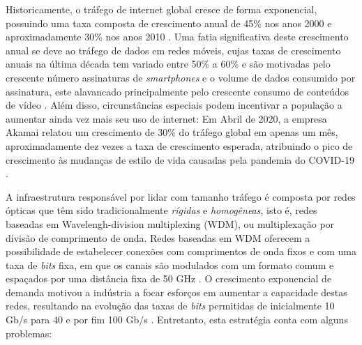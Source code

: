 

Historicamente, o tráfego de internet global cresce de forma exponencial, possuindo uma taxa composta de crescimento anual de 45\% nos anos 2000 \cite{network_evolution_2020} e aproximadamente 30\% nos anos 2010 \cite{cisco2011cisco, cisco2012cisco, cisco2013cisco, cisco2014cisco, cisco2015cisco, cisco2016cisco, cisco2017cisco, cisco2018cisco}. Uma fatia significativa deste crescimento anual se deve ao tráfego de dados em redes móveis, cujas taxas de crescimento anuais na última década tem variado entre 50\% a 60\% e são motivadas pelo crescente número assinaturas de \textit{smartphones} e o volume de dados consumido por assinatura, este alavancado principalmente pelo crescente consumo de conteúdos de vídeo \cite{ericsson_mobility_report_2020}. Além disso, circunstâncias especiais podem incentivar a população a aumentar ainda vez mais seu uso de internet: Em Abril de 2020, a empresa Akamai relatou um crescimento de 30\% do tráfego global em apenas um mês, aproximadamente dez vezes a taxa de crescimento esperada, atribuindo o pico de crescimento às mudanças de estilo de vida causadas pela pandemia do COVID-19 \cite{mckeay_2020}.

A infraestrutura responsável por lidar com tamanho tráfego é composta por redes ópticas que têm sido tradicionalmente \textit{rígidas} e \textit{homogêneas}, isto é, redes baseadas em Wavelengh-division multiplexing (WDM), ou multiplexação por divisão de comprimento de onda. Redes baseadas em WDM oferecem a possibilidade de estabelecer conexões com comprimentos de onda fixos e com uma taxa de \textit{bits} fixa, em que os canais são modulados com um formato comum e espaçados por uma distância fixa de 50 GHz \cite{eon_tutorial_2014, jinno_eon_benefits}. O crescimento exponencial de demanda motivou a indústria a focar esforços em aumentar a capacidade destas redes, resultando na evolução das taxas de \textit{bits} permitidas de inicialmente 10 Gb/s para 40 e por fim 100 Gb/s \cite{vizcaino_eon_energy}. Entretanto, esta estratégia conta com alguns problemas:

